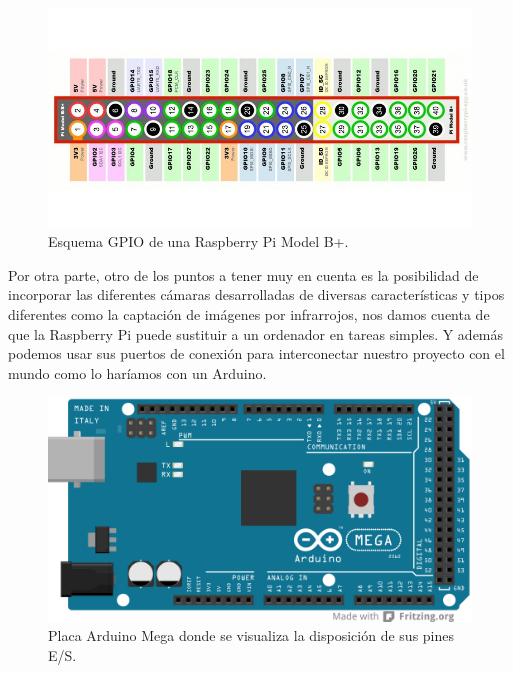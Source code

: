 \begin{figure}[H]
  \begin{center}
    \includegraphics[scale=0.4]{imagenes/robot/gpio-conexiones.jpg}
  \end{center}
  \caption{Esquema GPIO de una Raspberry Pi Model B+.}
  \label{gantt:tareas01}
\end{figure}

Por otra parte, otro de los puntos a tener muy en cuenta es la posibilidad de incorporar las diferentes cámaras desarrolladas de diversas características y tipos diferentes como
la captación de imágenes por infrarrojos, nos damos cuenta de que la Raspberry Pi puede sustituir a un ordenador en tareas simples. Y además podemos usar sus puertos de conexión
para interconectar nuestro proyecto con el mundo como lo haríamos con un Arduino.\\

\begin{figure}[H]
  \begin{center}
    \includegraphics[scale=0.4]{imagenes/arduino_mega_pinout.png}
  \end{center}
  \caption{Placa Arduino Mega donde se visualiza la disposición de sus pines E/S.}
  \label{gantt:tareas01}
\end{figure}

